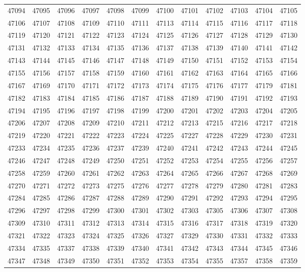 \begin{center}
\begin{longtable}{llllllllllll}
47094 &47095 &47096 &47097 &47098 &47099 &47100 &47101 &47102 &47103 &47104 &47105 \\
47106 &47107 &47108 &47109 &47110 &47111 &47113 &47114 &47115 &47116 &47117 &47118 \\
47119 &47120 &47121 &47122 &47123 &47124 &47125 &47126 &47127 &47128 &47129 &47130 \\
47131 &47132 &47133 &47134 &47135 &47136 &47137 &47138 &47139 &47140 &47141 &47142 \\
47143 &47144 &47145 &47146 &47147 &47148 &47149 &47150 &47151 &47152 &47153 &47154 \\
47155 &47156 &47157 &47158 &47159 &47160 &47161 &47162 &47163 &47164 &47165 &47166 \\
47167 &47169 &47170 &47171 &47172 &47173 &47174 &47175 &47176 &47177 &47179 &47181 \\
47182 &47183 &47184 &47185 &47186 &47187 &47188 &47189 &47190 &47191 &47192 &47193 \\
47194 &47195 &47196 &47197 &47198 &47199 &47200 &47201 &47202 &47203 &47204 &47205 \\
47206 &47207 &47208 &47209 &47210 &47211 &47212 &47213 &47215 &47216 &47217 &47218 \\
47219 &47220 &47221 &47222 &47223 &47224 &47225 &47227 &47228 &47229 &47230 &47231 \\
47233 &47234 &47235 &47236 &47237 &47239 &47240 &47241 &47242 &47243 &47244 &47245 \\
47246 &47247 &47248 &47249 &47250 &47251 &47252 &47253 &47254 &47255 &47256 &47257 \\
47258 &47259 &47260 &47261 &47262 &47263 &47264 &47265 &47266 &47267 &47268 &47269 \\
47270 &47271 &47272 &47273 &47275 &47276 &47277 &47278 &47279 &47280 &47281 &47283 \\
47284 &47285 &47286 &47287 &47288 &47289 &47290 &47291 &47292 &47293 &47294 &47295 \\
47296 &47297 &47298 &47299 &47300 &47301 &47302 &47303 &47305 &47306 &47307 &47308 \\
47309 &47310 &47311 &47312 &47313 &47314 &47315 &47316 &47317 &47318 &47319 &47320 \\
47321 &47322 &47323 &47324 &47325 &47326 &47327 &47329 &47330 &47331 &47332 &47333 \\
47334 &47335 &47337 &47338 &47339 &47340 &47341 &47342 &47343 &47344 &47345 &47346 \\
47347 &47348 &47349 &47350 &47351 &47352 &47353 &47354 &47355 &47357 &47358 &47359 \\

\end{longtable}
\end{center}
